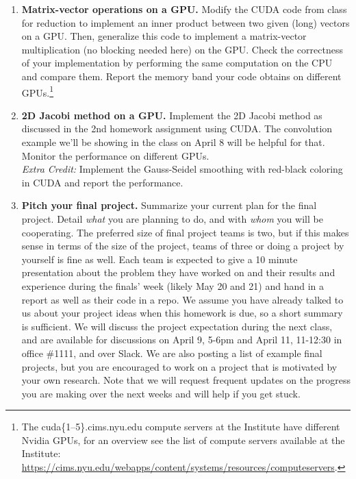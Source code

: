 \documentclass[12pt]{article}
\begin{document}
\begin{enumerate}

\item {\bf Matrix-vector operations on a GPU.} Modify the
  CUDA code from class for reduction to implement an inner product between two given
  (long) vectors on a GPU. Then, generalize this code to implement a
  matrix-vector multiplication (no blocking needed here) on the
  GPU. Check the correctness of your implementation by performing the same
  computation on the CPU and compare them. Report the memory band your
  code obtains
  on different GPUs.\footnote{The cuda\{1--5\}.cims.nyu.edu compute servers at
  the Institute have different Nvidia GPUs, for an overview see the list of
  compute servers available at the Institute:
  \url{https://cims.nyu.edu/webapps/content/systems/resources/computeservers}.}
  
\item {\bf 2D Jacobi method on a GPU.}
  Implement the 2D Jacobi method as discussed in the 2nd homework
  assignment using CUDA. The convolution example we'll be showing in
  the class on April 8 will be helpful for that. Monitor the
  performance on different GPUs.\\
  {\em Extra Credit:} Implement the Gauss-Seidel smoothing with
  red-black coloring in CUDA and report the performance.

\item {\bf Pitch your final project.}  Summarize your current plan for
  the final project.  Detail \emph{what} you are planning to do, and
  with \emph{whom} you will be cooperating. The preferred size of
  final project teams is two, but if this makes sense in terms of the
  size of the project, teams of three or doing a project by
  yourself is fine as well.  Each team is expected to give a 10 minute
  presentation about the problem they have worked on and their results
  and experience during the finals' week
  (likely May 20 and 21) and hand in a report as well as their code in
  a repo.  We assume you have
  already talked to us about your project ideas when this homework is due, so a
  short summary is sufficient. We will
  discuss the project expectation during the next class, and are
  available for discussions on April 9, 5-6pm and April 11, 11-12:30
  in office \#1111, and over Slack. We are also posting a list of
  example final projects, but you are encouraged to work on a project that is
  motivated by your own research. Note that we will request
  frequent updates on the progress you are making over the next weeks
  and will help if you get stuck.
\end{enumerate}
\end{document}
